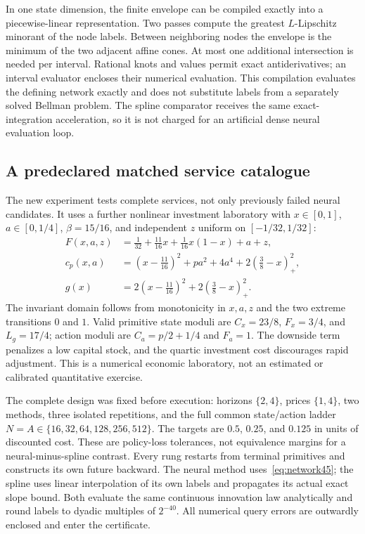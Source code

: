 In one state dimension, the finite envelope can be compiled exactly into a piecewise-linear representation. Two passes compute the greatest $L$-Lipschitz minorant of the node labels. Between neighboring nodes the envelope is the minimum of the two adjacent affine cones. At most one additional intersection is needed per interval. Rational knots and values permit exact antiderivatives; an interval evaluator encloses their numerical evaluation. This compilation evaluates the defining network exactly and does not substitute labels from a separately solved Bellman problem. The spline comparator receives the same exact-integration acceleration, so it is not charged for an artificial dense neural evaluation loop.

\subsection{A predeclared matched service catalogue}\label{sec:catalogue45}
The new experiment tests complete services, not only previously failed neural candidates. It uses a further nonlinear investment laboratory with $x\in[0,1]$, $a\in[0,1/4]$, $\beta=15/16$, and independent $z$ uniform on $[-1/32,1/32]$:
\begin{align}\label{eq:economy45}
 F(x,a,z)&=\tfrac1{32}+\tfrac{11}{16}x+\tfrac1{16}x(1-x)+a+z,\\
 c_p(x,a)&=(x-\tfrac{11}{16})^2+pa^2+4a^4+2(\tfrac38-x)_+^2,\\
 g(x)&=2(x-\tfrac{11}{16})^2+2(\tfrac38-x)_+^2.
\end{align}
The invariant domain follows from monotonicity in $x,a,z$ and the two extreme transitions $0$ and $1$. Valid primitive state moduli are $C_x=23/8$, $F_x=3/4$, and $L_g=17/4$; action moduli are $C_a=p/2+1/4$ and $F_a=1$. The downside term penalizes a low capital stock, and the quartic investment cost discourages rapid adjustment. This is a numerical economic laboratory, not an estimated or calibrated quantitative exercise.

The complete design was fixed before execution: horizons $\{2,4\}$, prices $\{1,4\}$, two methods, three isolated repetitions, and the full common state/action ladder $N=A\in\{16,32,64,128,256,512\}$. The targets are $0.5$, $0.25$, and $0.125$ in units of discounted cost. These are policy-loss tolerances, not equivalence margins for a neural-minus-spline contrast. Every rung restarts from terminal primitives and constructs its own future backward. The neural method uses~\eqref{eq:network45}; the spline uses linear interpolation of its own labels and propagates its actual exact slope bound. Both evaluate the same continuous innovation law analytically and round labels to dyadic multiples of $2^{-40}$. All numerical query errors are outwardly enclosed and enter the certificate.

